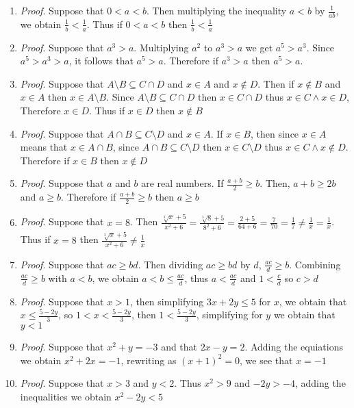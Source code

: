 \begin{enumerate}
\item
\textit{Proof}. Suppose that $0 < a < b$. Then multiplying the inequality $a<b$ by $\frac{1}{ab}$, we obtain $\frac{1}{b} < \frac{1}{a}$. Thus if $0 < a < b$ then $\frac{1}{b} < \frac{1}{a}$
\item
\textit{Proof}. Suppose that $a^3 > a$.
Multiplying $a^2$ to $a^3 > a$ we get $a^5 > a^3$. Since $a^5 > a^3 > a$, it follows that $a^5 > a$. Therefore if $a^3 > a$ then $a^5> a$.
\item
\textit{Proof}. Suppose that $A \setminus B \subseteq C \cap D$ and $x \in A$ and $x \notin D$. Then if $x \notin B$ and $x \in A$ then $x \in A \setminus B$. Since $A \setminus B \subseteq C \cap D$ then $x \in C \cap D$ thus $x \in C \land x \in D$, Therefore $x \in D$.
Thus if $x \in D$ then $x \notin B$
\item
\textit{Proof}. Suppose that $A \cap B \subseteq C \setminus D$ and $x \in A$. If $x \in B$, then since $x \in A$ means that $x \in A \cap B$, since $A \cap B \subseteq C \setminus D$ then $x \in C \setminus D$ thus $x \in C \land x \notin D$. 
Therefore if $x \in B$ then $x \notin D$
\item
\textit{Proof}. Suppose that $a$ and $b$ are real numbers. If $\frac{a+b}{2} \ge b$. Then, $a+b \ge 2b$ and $a \ge b$. Therefore if $\frac{a+b}{2} \ge b$ then $a \ge b$
\item
\textit{Proof}. Suppose that $x = 8$. Then $\frac{\sqrt[3]{x} + 5}{x^2 + 6} = \frac{\sqrt[3]{8} + 5}{8^2 + 6} = \frac{2 + 5}{64 + 6} = \frac{7}{70} = \frac{1}{7} \neq \frac{1}{x} = \frac{1}{x}$. Thus if $x = 8$ then $\frac{\sqrt[3]{x} + 5}{x^2 + 6} \neq \frac{1}{x}$
\item
\textit{Proof}. Suppose that $ac \ge bd$. Then dividing $ac \ge bd$ by $d$, $\frac{ac}{d} \ge b$. Combining $\frac{ac}{d} \ge b$ with $a < b$, we obtain $a < b \le \frac{ac}{d}$, thus $a < \frac{ac}{d}$ and $1 < \frac{c}{d}$ so $c > d$
\item
\textit{Proof}. Suppose that $x > 1$, then simplifying $3x + 2y \leq 5$ for $x$, we obtain that $x \leq \frac{5 - 2y}{3}$, so $1 < x < \frac{5 - 2y}{3}$, then $1 < \frac{5 - 2y}{3}$, simplifying for $y$ we obtain that $y < 1$
\item
\textit{Proof}. Suppose that $x^2 + y = -3$ and that $2x - y = 2$. Adding the equiations we obtain $x^2 + 2x = -1$, rewriting as $(x+1)^2 = 0$, we see that $x = -1$
\item
\textit{Proof}. Suppose that $x > 3$ and $y < 2$.
Thus $x^2 > 9$ and $-2y > -4$, adding the inequalities we obtain $x^2 - 2y < 5$

\end{enumerate}
